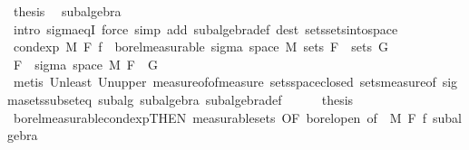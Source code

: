 \begin{isabellebody}
\ {\isacharquery}{\kern0pt}thesis\ \isamarkupfalse%
\ subalgebra\ \isamarkupfalse%
\ {\isacharparenleft}{\kern0pt}intro\ sigma{\isacharunderscore}{\kern0pt}eqI{\isacharparenright}{\kern0pt}\ {\isacharparenleft}{\kern0pt}force\ simp\ add{\isacharcolon}{\kern0pt}\ subalgebra{\isacharunderscore}{\kern0pt}def\ dest{\isacharcolon}{\kern0pt}\ sets{\isachardot}{\kern0pt}sets{\isacharunderscore}{\kern0pt}into{\isacharunderscore}{\kern0pt}space{\isacharparenright}{\kern0pt}{\isacharplus}{\kern0pt}\isanewline
\ \ \isamarkupfalse%
\isanewline
\ \ \isamarkupfalse%
\ \isamarkupfalse%
\ {\isachardoublequoteopen}{\isacharparenleft}{\kern0pt}cond{\isacharunderscore}{\kern0pt}exp\ M\ F\ f{\isacharparenright}{\kern0pt}\ {\isasymin}\ borel{\isacharunderscore}{\kern0pt}measurable\ {\isacharparenleft}{\kern0pt}sigma\ {\isacharparenleft}{\kern0pt}space\ M{\isacharparenright}{\kern0pt}\ {\isacharparenleft}{\kern0pt}sets\ F\ {\isasymunion}\ sets\ G{\isacharparenright}{\kern0pt}{\isacharparenright}{\kern0pt}{\isachardoublequoteclose}\isanewline
\ \ \isamarkupfalse%
\ {\isacharminus}{\kern0pt}\isanewline
\ \ \ \ \isamarkupfalse%
\ {\isachardoublequoteopen}F\ {\isasymsubseteq}\ sigma\ {\isacharparenleft}{\kern0pt}space\ M{\isacharparenright}{\kern0pt}\ {\isacharparenleft}{\kern0pt}F\ {\isasymunion}\ G{\isacharparenright}{\kern0pt}{\isachardoublequoteclose}\ \isamarkupfalse%
\ {\isacharparenleft}{\kern0pt}metis\ Un{\isacharunderscore}{\kern0pt}least\ Un{\isacharunderscore}{\kern0pt}upper{}\ measure{\isacharunderscore}{\kern0pt}of{\isacharunderscore}{\kern0pt}of{\isacharunderscore}{\kern0pt}measure\ sets{\isachardot}{\kern0pt}space{\isacharunderscore}{\kern0pt}closed\ sets{\isacharunderscore}{\kern0pt}measure{\isacharunderscore}{\kern0pt}of\ sigma{\isacharunderscore}{\kern0pt}sets{\isacharunderscore}{\kern0pt}subseteq\ subalg\ subalgebra{\isacharparenleft}{\kern0pt}{}{\isacharparenright}{\kern0pt}\ subalgebra{\isacharunderscore}{\kern0pt}def{\isacharparenright}{\kern0pt}\isanewline
\ \ \ \ \isamarkupfalse%
\ {\isacharquery}{\kern0pt}thesis\ \isamarkupfalse%
\ borel{\isacharunderscore}{\kern0pt}measurable{\isacharunderscore}{\kern0pt}cond{\isacharunderscore}{\kern0pt}exp{\isacharbrackleft}{\kern0pt}THEN\ measurable{\isacharunderscore}{\kern0pt}sets{\isacharcomma}{\kern0pt}\ OF\ borel{\isacharunderscore}{\kern0pt}open{\isacharcomma}{\kern0pt}\ of\ {\isacharunderscore}{\kern0pt}\ M\ F\ f{\isacharbrackright}{\kern0pt}\ subalgebra\ \isamarkupfalse%

\end{isabellebody}

